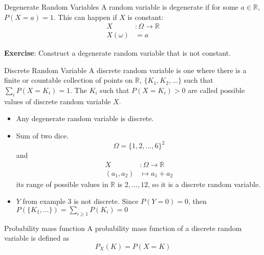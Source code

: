 \documentclass{report}
\begin{document}
\begin{definition}{Degenerate Random Variables}
    A random variable is degenerate if for some $a \in \mathbb{R}$, $P(X = a) = 1$. This can happen if $X$ is constant:
        \begin{align*}
            X    &: \Omega \rightarrow\mathbb{R} \\
            X(\omega) &= a                              
        \end{align*}
\end{definition}

\textbf{Exercise}: Construct a degenerate random variable that is not constant.

\begin{definition}{Discrete Random Variable}
    A discrete random variable is one where there is a finite or countable collection of points on $\mathbb{R}$, $\{K_{1}, K_{2}, \ldots\}$ such that $\sum_{i} P(X = K_{i}) = 1$. The $K_{i}$ such that $P(X = K_{i}) > 0$ are called possible values of discrete random variable $X$.
\end{definition}

\begin{examples}
    \begin{itemize}
        \item Any degenerate random variable is discrete. 

        \item Sum of two dice. 
            \begin{equation*}
                \Omega = \{1, 2, \ldots, 6\}^{2}
            \end{equation*}
        and
            \begin{align*}
                X              &:       \Omega \rightarrow \mathbb{R} \\
                (a_{1}, a_{2}) &\mapsto a_{1} + a_{2}                   
            \end{align*}
        its range of possible values in $\mathbb{R}$ is $2, \ldots, 12$, so it is a discrete random variable. 

        \item $Y$ from example $3$ is not discrete. Since $P(Y = 0) = 0$, then $P(\{K_{1}, \ldots\}) = \sum_{i \geq 1} P(K_{i}) = 0$
    \end{itemize}
\end{examples}

\begin{definition}{Probability mass function}
    A probability mass function of a discrete random variable is defined as 
        \begin{equation*}
            P_{X}(K) = P(X = K)
        \end{equation*}
\end{definition}
\end{document}
